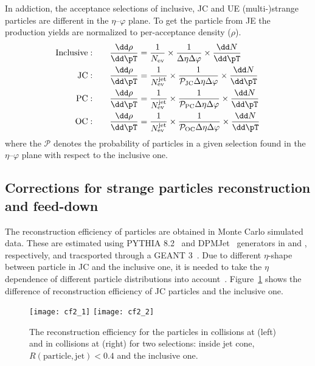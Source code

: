 In addiction, the acceptance selections of inclusive, JC and UE (multi-)strange particles are different in the $\eta$--$\varphi$ plane. To get the particle from JE the production yields are normalized to per-acceptance density ($\rho$).
\begin{equation}
\begin{split}
{\rm Inclusive:}\qquad & \frac{\dd\rho}{\dd\pT} = \frac{1}{N_{\rm ev}}\times\frac{1}{\Delta\eta\Delta\varphi}\times\frac{\dd N}{\dd\pT} \\
{\rm JC:}\qquad & \frac{\dd\rho}{\dd\pT} = \frac{1}{N_{\rm ev}^{\rm jet}} \times\frac{1}{\mathcal{P}_{\rm JC}\Delta\eta\Delta\varphi}\times\frac{\dd N}{\dd\pT} \\
{\rm PC:}\qquad & \frac{\dd\rho}{\dd\pT} = \frac{1}{N_{\rm ev}^{\rm jet}} \times\frac{1}{\mathcal{P}_{\rm PC}\Delta\eta\Delta\varphi}\times\frac{\dd N}{\dd\pT} \\
{\rm OC:}\qquad & \frac{\dd\rho}{\dd\pT} = \frac{1}{N_{\rm ev}^{\rm jet}} \times\frac{1}{\mathcal{P}_{\rm OC}\Delta\eta\Delta\varphi}\times\frac{\dd N}{\dd\pT} \\
\end{split}
\end{equation}
where the $\mathcal{P}$ denotes the probability of particles in a given selection found in the $\eta$--$\varphi$ plane with respect to the inclusive one.

\subsection{Corrections for strange particles reconstruction and feed-down}
\label{SubSec:Correction}
The reconstruction efficiency of particles are obtained in Monte Carlo simulated data. These are estimated using PYTHIA 8.2~\cite{Sjostrand:2014zea} and DPMJet~\cite{Roesler:2000he} generators in \pp and \pPb, respectively, and tracsported through a GEANT 3~\cite{Brun:1994aa}. Due to different $\eta$-shape between particle in JC and the inclusive one, it is needed to take the $\eta$ dependence of different particle distributions into account~\cite{V0injet}. Figure~\ref{Fig:EffiJCIncl} shows the difference of reconstruction efficiency of JC particles and the inclusive one. 
\begin{figure}[!ht]
	\begin{center}
		\texttt{[image: cf2\_1]}
		\texttt{[image: cf2\_2]}
	\end{center}
	\caption{The reconstruction efficiency for the particles in \pp collisions at \thirteen (left) and in \pPb collisions at \fivenn (right) for two selections: inside jet cone, $R(\mathrm{particle, jet}) < 0.4$ and the inclusive one.}
	\label{Fig:EffiJCIncl}
\end{figure}

